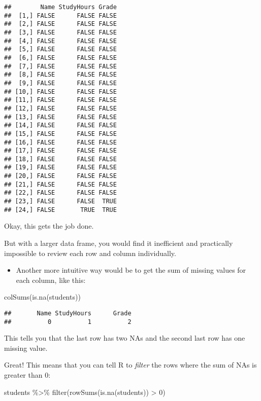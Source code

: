 \documentclass[
]{article}
\newenvironment{Shaded}{\begin{snugshade}}{\end{snugshade}}
\newcommand{\DecValTok}[1]{\textcolor[rgb]{0.00,0.00,0.81}{#1}}
\newcommand{\FunctionTok}[1]{\textcolor[rgb]{0.00,0.00,0.00}{#1}}
\newcommand{\NormalTok}[1]{#1}
\newcommand{\SpecialCharTok}[1]{\textcolor[rgb]{0.00,0.00,0.00}{#1}}
\providecommand{\tightlist}{%
  \setlength{\itemsep}{0pt}\setlength{\parskip}{0pt}}
\begin{document}
\begin{verbatim}
##        Name StudyHours Grade
##  [1,] FALSE      FALSE FALSE
##  [2,] FALSE      FALSE FALSE
##  [3,] FALSE      FALSE FALSE
##  [4,] FALSE      FALSE FALSE
##  [5,] FALSE      FALSE FALSE
##  [6,] FALSE      FALSE FALSE
##  [7,] FALSE      FALSE FALSE
##  [8,] FALSE      FALSE FALSE
##  [9,] FALSE      FALSE FALSE
## [10,] FALSE      FALSE FALSE
## [11,] FALSE      FALSE FALSE
## [12,] FALSE      FALSE FALSE
## [13,] FALSE      FALSE FALSE
## [14,] FALSE      FALSE FALSE
## [15,] FALSE      FALSE FALSE
## [16,] FALSE      FALSE FALSE
## [17,] FALSE      FALSE FALSE
## [18,] FALSE      FALSE FALSE
## [19,] FALSE      FALSE FALSE
## [20,] FALSE      FALSE FALSE
## [21,] FALSE      FALSE FALSE
## [22,] FALSE      FALSE FALSE
## [23,] FALSE      FALSE  TRUE
## [24,] FALSE       TRUE  TRUE
\end{verbatim}

Okay, this gets the job done.

But with a larger data frame, you would find it inefficient and
practically impossible to review each row and column individually.

\begin{itemize}
\tightlist
\item
  Another more intuitive way would be to get the sum of missing values
  for each column, like this:
\end{itemize}

\begin{Shaded}
\begin{Highlighting}[]
\FunctionTok{colSums}\NormalTok{(}\FunctionTok{is.na}\NormalTok{(students))}
\end{Highlighting}
\end{Shaded}

\begin{verbatim}
##       Name StudyHours      Grade 
##          0          1          2
\end{verbatim}

This tells you that the last row has two NAs and the second last row has
one missing value.

Great! This means that you can tell R to \emph{filter} the rows where
the sum of NAs is greater than 0:

\begin{Shaded}
\begin{Highlighting}[]
\NormalTok{students }\SpecialCharTok{\%\textgreater{}\%} 
  \FunctionTok{filter}\NormalTok{(}\FunctionTok{rowSums}\NormalTok{(}\FunctionTok{is.na}\NormalTok{(students)) }\SpecialCharTok{\textgreater{}} \DecValTok{0}\NormalTok{)}
\end{Highlighting}
\end{Shaded}
\end{document}
